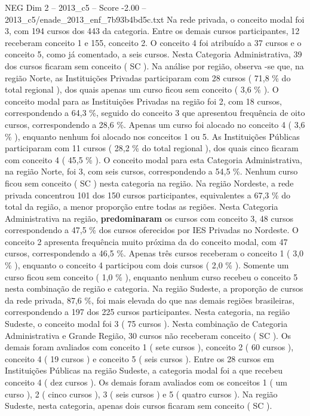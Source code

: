 \begin{textsample}{NEG Dim 2 – 2013\_c5 – Score -2.00 – 2013\_c5/enade\_2013\_enf\_7b93b4bd5c.txt}
Na rede privada, o conceito modal foi 3, com 194 cursos dos 443 da categoria.
Entre os demais cursos participantes, 12 receberam conceito 1 e 155, conceito 2.
O conceito 4 foi atribuído a 37 cursos e o conceito 5, como já comentado, a seis cursos.
Nesta Categoria Administrativa, 39 dos cursos ficaram sem conceito ( SC ).
Na análise por região, observa -se que, na região Norte, as Instituições Privadas participaram com 28 cursos ( 71,8 \% do total regional ), dos quais apenas um curso ficou sem conceito ( 3,6 \% ).
O conceito modal para as Instituições Privadas na região foi 2, com 18 cursos, correspondendo a 64,3 \%, seguido do conceito 3 que apresentou frequência de oito cursos, correspondendo a 28,6 \%.
Apenas um curso foi alocado no conceito 4 ( 3,6 \% ), enquanto nenhum foi alocado nos conceitos 1 ou 5.
As Instituições Públicas participaram com 11 cursos ( 28,2 \% do total regional ), dos quais cinco ficaram com conceito 4 ( 45,5 \% ).
O conceito modal para esta Categoria Administrativa, na região Norte, foi 3, com seis cursos, correspondendo a 54,5 \%.
Nenhum curso ficou sem conceito ( SC ) nesta categoria na região.
Na região Nordeste, a rede privada concentrou 101 dos 150 cursos participantes, equivalentes a 67,3 \% do total da região, a menor proporção entre todas as regiões.
Nesta Categoria Administrativa na região, \textbf{predominaram} os cursos com conceito 3, 48 cursos correspondendo a 47,5 \% dos cursos oferecidos por IES Privadas no Nordeste.
O conceito 2 apresenta frequência muito próxima da do conceito modal, com 47 cursos, correspondendo a 46,5 \%.
Apenas três cursos receberam o conceito 1 ( 3,0 \% ), enquanto o conceito 4 participou com dois cursos ( 2,0 \% ).
Somente um curso ficou sem conceito ( 1,0 \% ), enquanto nenhum curso recebeu o conceito 5 nesta combinação de região e categoria.
Na região Sudeste, a proporção de cursos da rede privada, 87,6 \%, foi mais elevada do que nas demais regiões brasileiras, correspondendo a 197 dos 225 cursos participantes.
Nesta categoria, na região Sudeste, o conceito modal foi 3 ( 75 cursos ).
Nesta combinação de Categoria Administrativa e Grande Região, 30 cursos não receberam conceito ( SC ).
Os demais foram avaliados com conceito 1 ( sete cursos ), conceito 2 ( 60 cursos ), conceito 4 ( 19 cursos ) e conceito 5 ( seis cursos ).
Entre os 28 cursos em Instituições Públicas na região Sudeste, a categoria modal foi a que recebeu conceito 4 ( dez cursos ).
Os demais foram avaliados com os conceitos 1 ( um curso ), 2 ( cinco cursos ), 3 ( seis cursos ) e 5 ( quatro cursos ).
Na região Sudeste, nesta categoria, apenas dois cursos ficaram sem conceito ( SC ).

\end{textsample}
